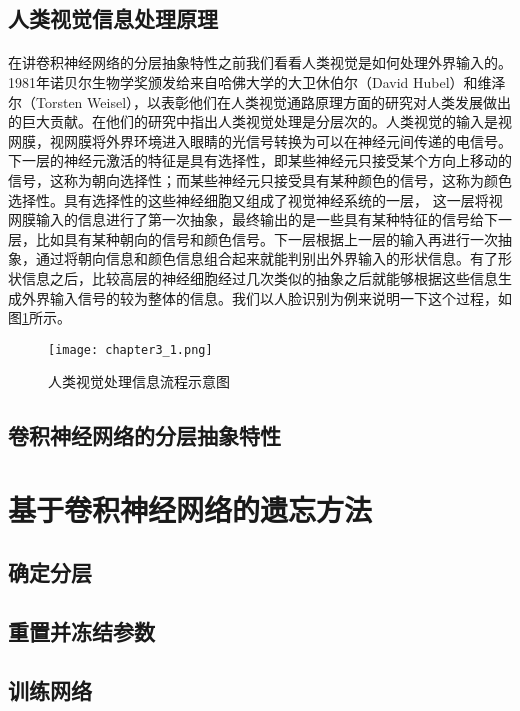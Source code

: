 \subsection{人类视觉信息处理原理}
\paragraph{}在讲卷积神经网络的分层抽象特性之前我们看看人类视觉是如何处理外界输入的。1981年诺贝尔生物学奖颁发给来自哈佛大学的大卫休伯尔（David Hubel）和维泽尔（Torsten Weisel），以表彰他们在人类视觉通路原理方面的研究对人类发展做出的巨大贡献。在他们的研究中指出人类视觉处理是分层次的。人类视觉的输入是视网膜，视网膜将外界环境进入眼睛的光信号转换为可以在神经元间传递的电信号。下一层的神经元激活的特征是具有选择性，即某些神经元只接受某个方向上移动的信号，这称为朝向选择性；而某些神经元只接受具有某种颜色的信号，这称为颜色选择性。具有选择性的这些神经细胞又组成了视觉神经系统的一层， 这一层将视网膜输入的信息进行了第一次抽象，最终输出的是一些具有某种特征的信号给下一层，比如具有某种朝向的信号和颜色信号。下一层根据上一层的输入再进行一次抽象，通过将朝向信息和颜色信息组合起来就能判别出外界输入的形状信息。有了形状信息之后，比较高层的神经细胞经过几次类似的抽象之后就能够根据这些信息生成外界输入信号的较为整体的信息。我们以人脸识别为例来说明一下这个过程，如图\ref{fig:chapter3_1}所示。
\begin{figure}
    \centering
    \texttt{[image: chapter3\_1.png]}
    \caption{人类视觉处理信息流程示意图}
    \label{fig:chapter3_1}
\end{figure}

\subsection{卷积神经网络的分层抽象特性}

\section{基于卷积神经网络的遗忘方法}

\subsection{确定分层}

\subsection{重置并冻结参数}

\subsection{训练网络}


